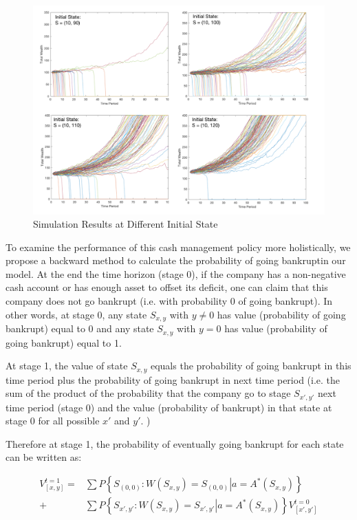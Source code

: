 \documentclass[12pt]{article}
\begin{document}
\begin{figure}
\begin{center}
\includegraphics[scale=.56]{simu}
\end{center}
\caption{Simulation Results at Different Initial State}
\label{simulation}
\end{figure}

To examine the performance of this cash management policy more holistically, we propose a backward method to calculate the probability of going bankruptin our model. At the end the time horizon (stage 0), if the company has a non-negative cash account or has enough asset to offset its deficit, one can claim that this company does not go bankrupt (i.e. with probability 0 of going bankrupt). In other words, at stage 0, any state $S_{x, y}$ with $y \neq 0$ has value (probability of going bankrupt) equal to 0 and any state $S_{x, y}$ with $y = 0$ has value (probability of going bankrupt) equal to 1. 

At stage 1, the value of state $S_{x, y}$ equals the probability of going bankrupt in this time period plus the probability of going bankrupt in next time period (i.e. the sum of the product of the probability that the company go to stage $S_{x', y'}$ next time period (stage 0) and the value (probability of bankrupt) in that state at stage 0 for all possible $x'$ and $y'$. )

Therefore at stage 1, the probability of eventually going bankrupt for each state can be written as: 

\[
\begin{split}
V_{[x,y]}^{t=1} =& \sum P\left\{\left.S_{(0,0)}:W(S_{x,y}) = S_{(0,0)}\right|a = A^*(S_{x,y})\right\} 
\\ 
+ & \sum P\left\{ \left. S_{x',y'}:W(S_{x,y}) = S_{x',y'} \right| a = A^* (S_{x,y})\right\}  V_{[x',y']}^{t=0}
\end{split}
\]
\end{document}
